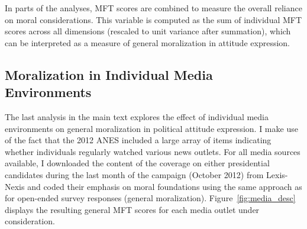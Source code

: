 \documentclass[12pt]{article}
\begin{document}
In parts of the analyses, MFT scores are combined to measure the overall reliance on moral considerations. This variable is computed as the sum of individual MFT scores across all dimensions (rescaled to unit variance after summation), which can be interpreted as a measure of general moralization in attitude expression.


\clearpage
\subsection{Moralization in Individual Media Environments}

The last analysis in the main text explores the effect of individual media environments on general moralization in political attitude expression. I make use of the fact that the 2012 ANES included a large array of items indicating whether individuals regularly watched various news outlets. For all media sources available, I downloaded the content of the coverage on either presidential candidates during the last month of the campaign (October 2012) from Lexis-Nexis and coded their emphasis on moral foundations using the same approach as for open-ended survey responses (general moralization). Figure~\ref{fig:media_desc} displays the resulting general MFT scores for each media outlet under consideration.
\end{document}
